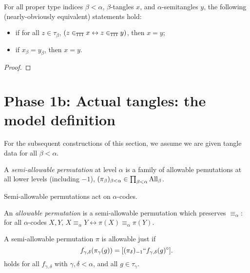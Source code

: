 \begin{theorem}
\label {thm:extensionality}
\leanok
For all proper type indices $\beta < \alpha$, $\beta$-tangles $x$, and $\alpha$-semitangles $y$, the following (nearly-obviously equivalent) statements hold:
\begin{itemize}
  \item if for all $z \in \tau_\beta$, $(z \in_{\tt TTT} x \leftrightarrow z \in_{\tt TTT} y)$, then $x=y$;
  \item if $x_\beta = y_\beta$, then $x=y$.
\end{itemize}
\end{theorem}
\begin{proof}\leanok\end{proof}

\section{Phase 1b: Actual tangles: the model definition}

  For the subsequent constructions of this section, we assume we are given tangle data for all $\beta < \alpha$.

\begin{definition}
\label {def:semiallowable-perm}
\leanok
{}
  A \emph{semi-allowable permutation} at level $\alpha$ is a family of allowable pemutations at all lower levels (including $-1$), $(\pi_\beta)_{\beta < \alpha} \in \prod_{\beta < \alpha} \mathrm{All}_\beta$.
\end{definition}

\begin{definition}
\label{def:code-action}
\leanok
Semi-allowable permutations act on $\alpha$-codes.
\end{definition}

\begin{definition}
  \label{def:allowable-perm}
  \leanok
  An \emph{allowable permutation} is a semi-allowable permutation which preserves $\equiv_\alpha$: for all $\alpha$-codes $X,Y$, $X \equiv_\alpha Y \leftrightarrow \pi(X) \equiv_\alpha \pi(Y)$.
\end{definition}

\begin{lemma}
\label {lem:coherence-unpacked}
\leanok
A semi-allowable permutation $\pi$ is allowable just if
$$f_{\gamma,\delta}(\pi_\gamma(g)) = [(\pi_\delta)_{-1}``f_{\gamma,\delta}(g)^\circ].$$
holds for all $f_{\gamma,\delta}$ with $\gamma,\delta<\alpha$, and all $g \in \tau_\gamma$.
\end{lemma}

